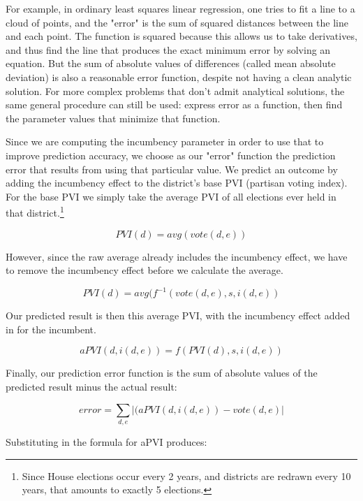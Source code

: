 \documentclass[preprint,12pt]{article}
\begin{document}
For example, in ordinary least squares linear regression, one tries to fit a line to a cloud of points, and the "error" is the sum of squared distances between the line and each point.   The function is squared because this allows us to take derivatives, and thus find the line that produces the exact minimum error by solving an equation.  But the sum of absolute values of differences (called mean absolute deviation) is also a reasonable error function, despite not having a clean analytic solution.  For more complex problems that don't admit analytical solutions, the same general procedure can still be used: express error as a function, then find the parameter values that minimize that function. 

Since we are computing the incumbency parameter in order to use that to improve prediction accuracy, we choose as our "error" function the prediction error that results from using that particular value.  We predict an outcome by adding the incumbency effect to the district's base PVI (partisan voting index).  For the base PVI we simply take the average PVI of all elections ever held in that district.\footnote{Since House elections occur every 2 years, and districts are redrawn every 10 years, that amounts to exactly 5 elections.}

\begin{equation}
PVI(d) = avg(vote(d,e))
\end{equation}

However, since the raw average already includes the incumbency effect, we have to remove the incumbency effect before we calculate the average.

\begin{equation}
PVI(d) = avg(f^{-1}(vote(d,e),s,i(d,e))
\end{equation}

Our predicted result is then this average PVI, with the incumbency effect added in for the incumbent.

\begin{equation}
aPVI(d,i(d,e)) = f(PVI(d),s,i(d,e))
\end{equation}

Finally, our prediction error function is the sum of absolute values of the predicted result minus the actual result:

\begin{equation}
error = \sum_{d, e}{\left| (aPVI(d,i(d,e)) - vote(d,e)\right|}
\end{equation}

Substituting in the formula for aPVI produces:
\end{document}
